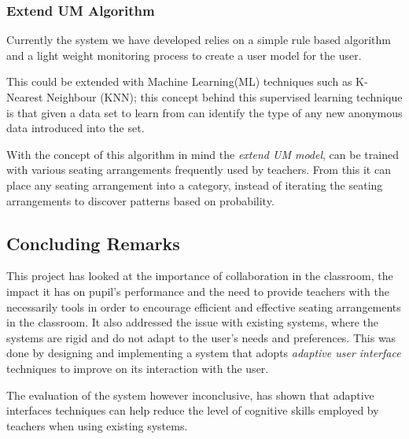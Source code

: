 \subsubsection{Extend UM Algorithm}
Currently the system we have developed relies on a simple rule based algorithm and a light weight monitoring process to create a user model for the user. 

This could be extended with Machine Learning(ML) techniques such as K-Nearest Neighbour (KNN); this concept behind this supervised learning technique is that given a data set to learn from can identify the type of any new anonymous data introduced into the set. 

With the concept of this algorithm in mind the \emph{extend UM model}, can be trained with various seating arrangements frequently used by teachers. From this it can place any seating arrangement into a category, instead of iterating the seating arrangements to discover patterns based on probability.  
 
\subsection{Concluding Remarks} 
This project has looked at the importance of collaboration in the classroom, the impact it has on pupil's performance and the need to provide teachers with the necessarily tools in order to encourage efficient and effective seating arrangements in the classroom. It also addressed the issue with existing systems, where the systems are rigid and do not adapt to the user's needs and preferences. This was done by designing and implementing a system that adopts \emph{adaptive user interface} techniques to improve on its interaction with the user.

The evaluation of the system however inconclusive, has shown that adaptive interfaces techniques can help reduce the level of cognitive skills employed by teachers when using existing systems. 